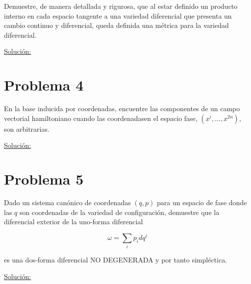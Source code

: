 \documentclass[a4paper,10pt]{article}
\numberwithin{equation}{section}
\begin{document}
Demuestre, de manera detallada y rigurosa, que al estar definido un producto interno 
en cada espacio tangente a una variedad diferencial que presenta un cambio continuo 
y diferencial, queda definida una métrica para la variedad diferencial.

\vspace{.3cm}

\underline{Solución:} \vspace{.3cm}

\section{Problema 4}

En la base inducida por coordenadas, encuentre las componentes de un campo vectorial 
hamiltoniano cuando las coordenadasen el espacio fase, $(x^i,\dots,x^{2n})$, son 
arbitrarias.

\vspace{.3cm}

\underline{Solución:} \vspace{.3cm}

\section{Problema 5}

Dado un sistema canónico de coordenadas $(q,p)$ para un espacio de fase donde las $q$ 
son coordenadas de la variedad de configuración, demuestre que la diferencial exterior 
de la uno-forma diferencial 

$$
\omega = \sum_i p_idq^i
$$

es una dos-forma diferencial NO DEGENERADA y por tanto simpléctica.

\vspace{.3cm}

\underline{Solución:} \vspace{.3cm}
\end{document}
